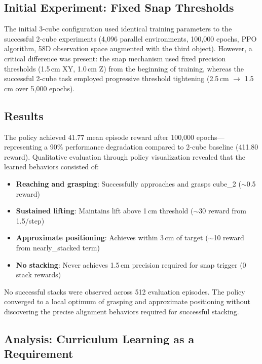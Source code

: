 \documentclass[12pt,a4paper,oneside]{report}
\begin{document}
\subsection{Initial Experiment: Fixed Snap Thresholds}

The initial 3-cube configuration used identical training parameters to the successful 2-cube experiments (4,096 parallel environments, 100,000 epochs, PPO algorithm, 58D observation space augmented with the third object). However, a critical difference was present: the snap mechanism used fixed precision thresholds (1.5\,cm XY, 1.0\,cm Z) from the beginning of training, whereas the successful 2-cube task employed progressive threshold tightening (2.5\,cm $\rightarrow$ 1.5\,cm over 5,000 epochs).

\subsection{Results}

The policy achieved 41.77 mean episode reward after 100,000 epochs---representing a 90\% performance degradation compared to 2-cube baseline (411.80 reward). Qualitative evaluation through policy visualization revealed that the learned behaviors consisted of:

\begin{itemize}
    \item \textbf{Reaching and grasping}: Successfully approaches and grasps cube\_2 ($\sim$0.5 reward)
    \item \textbf{Sustained lifting}: Maintains lift above 1\,cm threshold ($\sim$30 reward from 1.5/step)
    \item \textbf{Approximate positioning}: Achieves within 3\,cm of target ($\sim$10 reward from nearly\_stacked term)
    \item \textbf{No stacking}: Never achieves 1.5\,cm precision required for snap trigger (0 stack rewards)
\end{itemize}

No successful stacks were observed across 512 evaluation episodes. The policy converged to a local optimum of grasping and approximate positioning without discovering the precise alignment behaviors required for successful stacking.

\subsection{Analysis: Curriculum Learning as a Requirement}
\end{document}
